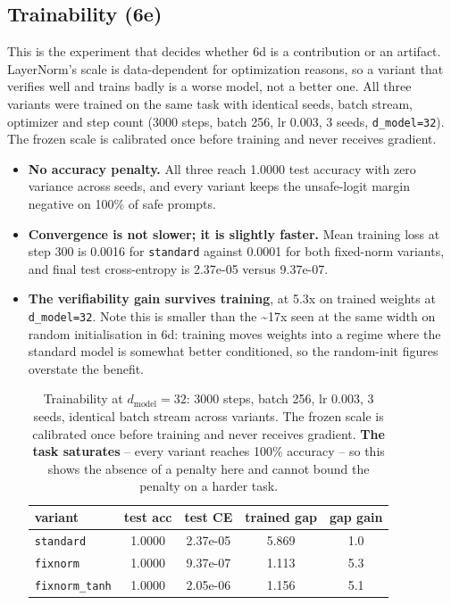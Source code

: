 \documentclass[10pt,journal]{IEEEtran}
\begin{document}
\subsection{Trainability (6e)}
This is the experiment that decides whether 6d is a contribution or an artifact. LayerNorm's scale is data-dependent for optimization reasons, so a variant that verifies well and trains badly is a worse model, not a better one. All three variants were trained on the same task with identical seeds, batch stream, optimizer and step count (3000 steps, batch 256, lr 0.003, 3 seeds, \texttt{d\_model=32}). The frozen scale is calibrated once before training and never receives gradient.
\begin{itemize}
\item \textbf{No accuracy penalty.} All three reach 1.0000 test accuracy with zero variance across seeds, and every variant keeps the unsafe-logit margin negative on 100\% of safe prompts.
\item \textbf{Convergence is not slower; it is slightly faster.} Mean training loss at step 300 is 0.0016 for \texttt{standard} against 0.0001 for both fixed-norm variants, and final test cross-entropy is 2.37e-05 versus 9.37e-07.
\item \textbf{The verifiability gain survives training}, at 5.3x on trained weights at \texttt{d\_model=32}. Note this is smaller than the \textasciitilde{}17x seen at the same width on random initialisation in 6d: training moves weights into a regime where the standard model is somewhat better conditioned, so the random-init figures overstate the benefit.

\begin{table}[t]
\centering
\caption{Trainability at $d_{\text{model}}=32$: 3000 steps, batch 256, lr 0.003, 3 seeds, identical batch stream across variants. The frozen scale is calibrated once before training and never receives gradient. \textbf{The task saturates} -- every variant reaches 100\% accuracy -- so this shows the absence of a penalty here and cannot bound the penalty on a harder task.}
\label{tab:trainability}
\begin{tabular}{l S[table-format=1.4] S[table-format=1.2e2] S[table-format=1.3] S[table-format=2.1]}
\toprule
variant & {test acc} & {test CE} & {trained gap} & {gap gain} \\
\midrule
\texttt{standard} & 1.0000 & 2.37e-05 & 5.869 & 1.0 \\
\texttt{fixnorm} & 1.0000 & 9.37e-07 & 1.113 & 5.3 \\
\texttt{fixnorm\_tanh} & 1.0000 & 2.05e-06 & 1.156 & 5.1 \\
\bottomrule
\end{tabular}
\end{table}

\end{itemize}
\end{document}

